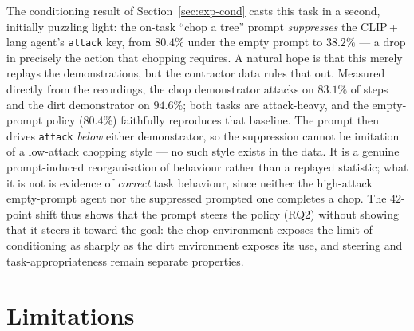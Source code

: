 The conditioning result of Section~\ref{sec:exp-cond} casts this task in a second,
initially puzzling light: the on-task \enquote{chop a tree} prompt \emph{suppresses}
the CLIP\,+\,lang agent's \texttt{attack} key, from $80.4\%$ under the empty prompt
to $38.2\%$ --- a drop in precisely the action that chopping requires. A natural
hope is that this merely replays the demonstrations, but the contractor data rules
that out. Measured directly from the recordings, the chop demonstrator attacks on
$83.1\%$ of steps and the dirt demonstrator on $94.6\%$; both tasks are
attack-heavy, and the empty-prompt policy ($80.4\%$) faithfully reproduces that
baseline. The prompt then drives \texttt{attack} \emph{below} either demonstrator,
so the suppression cannot be imitation of a low-attack chopping style --- no such
style exists in the data. It is a genuine prompt-induced reorganisation of
behaviour rather than a replayed statistic; what it is not is evidence of
\emph{correct} task behaviour, since neither the high-attack empty-prompt agent nor
the suppressed prompted one completes a chop. The $42$-point shift thus shows that
the prompt steers the policy (RQ2) without showing that it steers it toward the
goal: the chop environment exposes the limit of conditioning as sharply as the
dirt environment exposes its use, and steering and task-appropriateness remain
separate properties.

\section{Limitations}
\label{sec:disc-limits}

